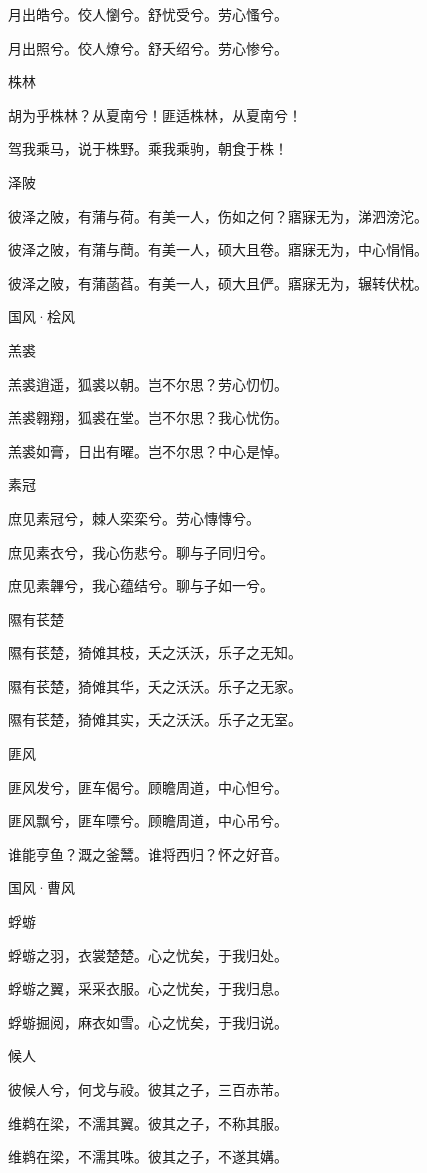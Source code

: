 月出皓兮。佼人懰兮。舒忧受兮。劳心慅兮。

月出照兮。佼人燎兮。舒夭绍兮。劳心惨兮。

株林

胡为乎株林？从夏南兮！匪适株林，从夏南兮！

驾我乘马，说于株野。乘我乘驹，朝食于株！

泽陂

彼泽之陂，有蒲与荷。有美一人，伤如之何？寤寐无为，涕泗滂沱。

彼泽之陂，有蒲与蕳。有美一人，硕大且卷。寤寐无为，中心悁悁。

彼泽之陂，有蒲菡萏。有美一人，硕大且俨。寤寐无为，辗转伏枕。




国风·桧风


羔裘

羔裘逍遥，狐裘以朝。岂不尔思？劳心忉忉。

羔裘翱翔，狐裘在堂。岂不尔思？我心忧伤。

羔裘如膏，日出有曜。岂不尔思？中心是悼。

素冠

庶见素冠兮，棘人栾栾兮。劳心慱慱兮。

庶见素衣兮，我心伤悲兮。聊与子同归兮。

庶见素韠兮，我心蕴结兮。聊与子如一兮。

隰有苌楚

隰有苌楚，猗傩其枝，夭之沃沃，乐子之无知。

隰有苌楚，猗傩其华，夭之沃沃。乐子之无家。

隰有苌楚，猗傩其实，夭之沃沃。乐子之无室。

匪风

匪风发兮，匪车偈兮。顾瞻周道，中心怛兮。

匪风飘兮，匪车嘌兮。顾瞻周道，中心吊兮。

谁能亨鱼？溉之釜鬵。谁将西归？怀之好音。




国风·曹风


蜉蝣

蜉蝣之羽，衣裳楚楚。心之忧矣，于我归处。

蜉蝣之翼，采采衣服。心之忧矣，于我归息。

蜉蝣掘阅，麻衣如雪。心之忧矣，于我归说。

候人

彼候人兮，何戈与祋。彼其之子，三百赤芾。

维鹈在梁，不濡其翼。彼其之子，不称其服。

维鹈在梁，不濡其咮。彼其之子，不遂其媾。

